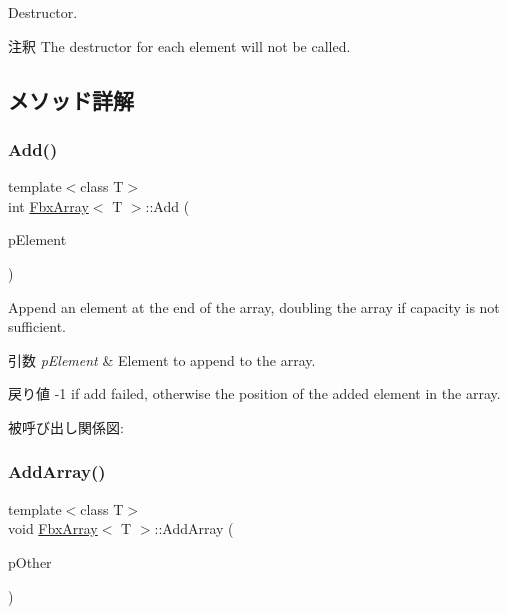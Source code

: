 Destructor. \begin{DoxyRemark}{注釈}
The destructor for each element will not be called. 
\end{DoxyRemark}


\subsection{メソッド詳解}
\mbox{\label{class_fbx_array_aad977e99a3924f6cd758f90c26435d21}} 
\subsubsection{\texorpdfstring{Add()}{Add()}}
{\footnotesize\ttfamily template$<$class T$>$ \\
int \hyperlink{class_fbx_array}{Fbx\+Array}$<$ T $>$\+::Add (\begin{DoxyParamCaption}\item[{const T \&}]{p\+Element }\end{DoxyParamCaption})}

Append an element at the end of the array, doubling the array if capacity is not sufficient. 
\begin{DoxyParams}{引数}
{\em p\+Element} & Element to append to the array. \\
\hline
\end{DoxyParams}
\begin{DoxyReturn}{戻り値}
-\/1 if add failed, otherwise the position of the added element in the array. 
\end{DoxyReturn}
被呼び出し関係図\+:
\mbox{\label{class_fbx_array_a741247b39ad378a6fbdae4377c718461}} 
\subsubsection{\texorpdfstring{Add\+Array()}{AddArray()}}
{\footnotesize\ttfamily template$<$class T$>$ \\
void \hyperlink{class_fbx_array}{Fbx\+Array}$<$ T $>$\+::Add\+Array (\begin{DoxyParamCaption}\item[{const \hyperlink{class_fbx_array}{Fbx\+Array}$<$ T $>$ \&}]{p\+Other }\end{DoxyParamCaption})}

